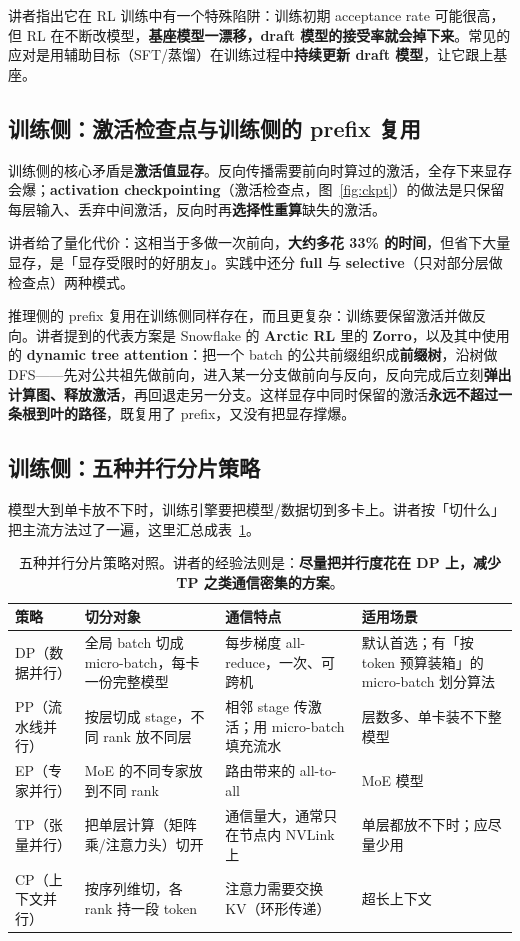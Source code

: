 \documentclass[a4paper]{article}
\begin{document}
讲者指出它在 RL 训练中有一个特殊陷阱：训练初期 acceptance rate 可能很高，但 RL 在不断改模型，\textbf{基座模型一漂移，draft 模型的接受率就会掉下来}。常见的应对是用辅助目标（SFT/蒸馏）在训练过程中\textbf{持续更新 draft 模型}，让它跟上基座。

\subsection{训练侧：激活检查点与训练侧的 prefix 复用}

训练侧的核心矛盾是\textbf{激活值显存}。反向传播需要前向时算过的激活，全存下来显存会爆；\textbf{activation checkpointing}（激活检查点，图~\ref{fig:ckpt}）的做法是只保留每层输入、丢弃中间激活，反向时再\textbf{选择性重算}缺失的激活。

讲者给了量化代价：这相当于多做一次前向，\textbf{大约多花 33\% 的时间}，但省下大量显存，是「显存受限时的好朋友」。实践中还分 \textbf{full} 与 \textbf{selective}（只对部分层做检查点）两种模式。

推理侧的 prefix 复用在训练侧同样存在，而且更复杂：训练要保留激活并做反向。讲者提到的代表方案是 Snowflake 的 \textbf{Arctic RL} 里的 \textbf{Zorro}，以及其中使用的 \textbf{dynamic tree attention}：把一个 batch 的公共前缀组织成\textbf{前缀树}，沿树做 DFS——先对公共祖先做前向，进入某一分支做前向与反向，反向完成后立刻\textbf{弹出计算图、释放激活}，再回退走另一分支。这样显存中同时保留的激活\textbf{永远不超过一条根到叶的路径}，既复用了 prefix，又没有把显存撑爆。

\subsection{训练侧：五种并行分片策略}

模型大到单卡放不下时，训练引擎要把模型/数据切到多卡上。讲者按「切什么」把主流方法过了一遍，这里汇总成表~\ref{tab:shard}。

\begin{table}[H]
\centering
\small
\begin{tabular}{@{}p{}p{}p{}p{}@{}}
\toprule
\textbf{策略} & \textbf{切分对象} & \textbf{通信特点} & \textbf{适用场景} \\
\midrule
DP（数据并行） & 全局 batch 切成 micro-batch，每卡一份完整模型 & 每步梯度 all-reduce，一次、可跨机 & 默认首选；有「按 token 预算装箱」的 micro-batch 划分算法 \\
PP（流水线并行） & 按层切成 stage，不同 rank 放不同层 & 相邻 stage 传激活；用 micro-batch 填充流水 & 层数多、单卡装不下整模型 \\
EP（专家并行） & MoE 的不同专家放到不同 rank & 路由带来的 all-to-all & MoE 模型 \\
TP（张量并行） & 把单层计算（矩阵乘/注意力头）切开 & 通信量大，通常只在节点内 NVLink 上 & 单层都放不下时；应尽量少用 \\
CP（上下文并行） & 按序列维切，各 rank 持一段 token & 注意力需要交换 KV（环形传递） & 超长上下文 \\
\bottomrule
\end{tabular}
\caption{五种并行分片策略对照。讲者的经验法则是：\textbf{尽量把并行度花在 DP 上，减少 TP 之类通信密集的方案}。}
\label{tab:shard}
\end{table}
\end{document}
